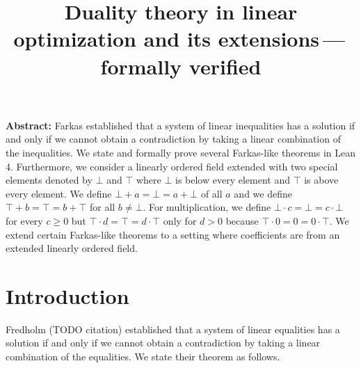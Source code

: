 \documentclass[]{article}
\renewcommand{\.}{\hskip .75pt}
\begin{document}


\title{Duality theory in linear optimization and its extensions\,---\,formally verified}
\date{}
\maketitle


\noindent \textbf{Abstract:}\;
Farkas established that a system of linear inequalities has a solution if and only if we cannot obtain
a contradiction by taking a linear combination of the inequalities.
We state and formally prove several Farkas-like theorems in Lean 4.
Furthermore, we consider a linearly ordered field extended with two special elements denoted by $\bot$ and $\top$
where $\bot$ is below every element and $\top$ is above every element.
We define $\bot + a = \bot = a + \bot$ of all $a$ and we define $\top + b = \top = b + \top$ for all $b \neq \bot$.
For multiplication, we define $\bot \cdot c = \bot = c \cdot \bot$ for every $c \ge 0$ but
$\top \cdot d = \top = d \cdot \top$ only for $d > 0$ because $\top \cdot 0 = 0 = 0 \cdot \top$.
We extend certain Farkas-like theorems to a setting where coefficients are from an extended linearly ordered field.


\section{Introduction}

Fredholm (TODO citation) established that
a system of linear equalities has a solution if and only if
we cannot obtain a contradiction by taking a linear combination of the equalities.
We state their theorem as follows.
\end{document}
